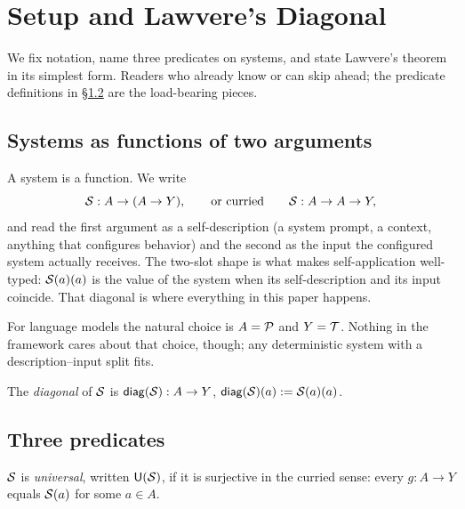 \section{Setup and Lawvere's Diagonal}
\label{sec:setup}

We fix notation, name three predicates on systems, and state Lawvere's theorem in its simplest form. Readers who already know \citet{lawvere1969} or \citet{yanofsky2003} can skip ahead; the predicate definitions in \S\ref{subsec:predicates} are the load-bearing pieces.

\subsection{Systems as functions of two arguments}
\label{subsec:system-function}

A system is a function. We write
\begin{equation}
\mathcal{S} : A \to (A \to Y),
\qquad \text{or curried} \qquad
\mathcal{S} : A \to A \to Y,
\end{equation}
and read the first argument as a self-description (a system prompt, a context, anything that configures behavior) and the second as the input the configured system actually receives. The two-slot shape is what makes self-application well-typed: $\mathcal{S}(a)(a)$ is the value of the system when its self-description and its input coincide. That diagonal is where everything in this paper happens.

For language models the natural choice is $A = \mathcal{P}$ and $Y = \mathcal{T}$. Nothing in the framework cares about that choice, though; any deterministic system with a description--input split fits.

\begin{definition}[Diagonal]
\label{def:diag}
The \emph{diagonal} of $\mathcal{S}$ is $\mathsf{diag}(\mathcal{S}) : A \to Y$, $\mathsf{diag}(\mathcal{S})(a) := \mathcal{S}(a)(a)$.
\end{definition}

\subsection{Three predicates}
\label{subsec:predicates}

\begin{definition}[Universal]
\label{def:universal}
$\mathcal{S}$ is \emph{universal}, written $\mathsf{U}(\mathcal{S})$, if it is surjective in the curried sense: every $g : A \to Y$ equals $\mathcal{S}(a)$ for some $a \in A$.
\end{definition}

